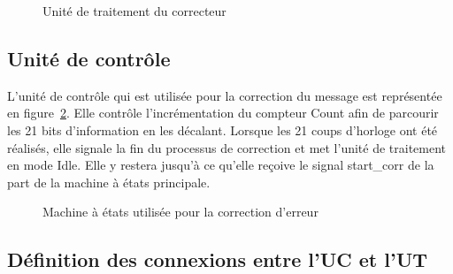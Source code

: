 \documentclass[a4paper, 11pt, svgnames]{report}
\begin{document}
\begin{figure}[H]
                \caption{Unité de traitement du correcteur}
                \label{fig:ut_corr}
            \end{figure}

            \subsection{Unité de contrôle}
                L'unité de contrôle qui est utilisée pour la correction du
                message est représentée en figure~\ref{fig:uc_corr}.
                Elle contrôle l'incrémentation du compteur Count afin de
                parcourir les 21 bits d'information en les décalant.
                Lorsque les 21 coups d'horloge ont été réalisés, elle signale
                la fin du processus de correction et met l'unité de traitement
                en mode Idle. Elle y restera jusqu'à ce qu'elle reçoive le
                signal start\_corr de la part de la machine à états principale.
            \begin{figure}[H]
                \centering
                \caption{Machine à états utilisée pour la correction d'erreur}
                \label{fig:uc_corr}
            \end{figure}

            \subsection{Définition des connexions entre l'UC et l'UT}
\end{document}
